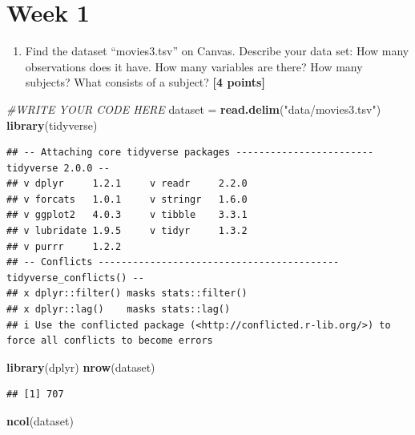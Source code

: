\documentclass[
]{article}
\newenvironment{Shaded}{\begin{snugshade}}{\end{snugshade}}
\newcommand{\CommentTok}[1]{\textcolor[rgb]{0.56,0.35,0.01}{\textit{#1}}}
\newcommand{\FunctionTok}[1]{\textcolor[rgb]{0.13,0.29,0.53}{\textbf{#1}}}
\newcommand{\NormalTok}[1]{#1}
\newcommand{\OtherTok}[1]{\textcolor[rgb]{0.56,0.35,0.01}{#1}}
\newcommand{\StringTok}[1]{\textcolor[rgb]{0.31,0.60,0.02}{#1}}
\providecommand{\tightlist}{%
  \setlength{\itemsep}{0pt}\setlength{\parskip}{0pt}}
\begin{document}
\section{Week 1}\label{week-1}

\begin{enumerate}
\def\labelenumi{\arabic{enumi}.}
\tightlist
\item
  Find the dataset ``movies3.tsv'' on Canvas. Describe your data set:
  How many observations does it have. How many variables are there? How
  many subjects? What consists of a subject? \textbf{[4 points]}
\end{enumerate}

\begin{Shaded}
\begin{Highlighting}[]
\CommentTok{\#WRITE YOUR CODE HERE}
\NormalTok{dataset }\OtherTok{=} \FunctionTok{read.delim}\NormalTok{(}\StringTok{"data/movies3.tsv"}\NormalTok{)}
\FunctionTok{library}\NormalTok{(tidyverse)}
\end{Highlighting}
\end{Shaded}

\begin{verbatim}
## -- Attaching core tidyverse packages ------------------------ tidyverse 2.0.0 --
## v dplyr     1.2.1     v readr     2.2.0
## v forcats   1.0.1     v stringr   1.6.0
## v ggplot2   4.0.3     v tibble    3.3.1
## v lubridate 1.9.5     v tidyr     1.3.2
## v purrr     1.2.2     
## -- Conflicts ------------------------------------------ tidyverse_conflicts() --
## x dplyr::filter() masks stats::filter()
## x dplyr::lag()    masks stats::lag()
## i Use the conflicted package (<http://conflicted.r-lib.org/>) to force all conflicts to become errors
\end{verbatim}

\begin{Shaded}
\begin{Highlighting}[]
\FunctionTok{library}\NormalTok{(dplyr)}
\FunctionTok{nrow}\NormalTok{(dataset)}
\end{Highlighting}
\end{Shaded}

\begin{verbatim}
## [1] 707
\end{verbatim}

\begin{Shaded}
\begin{Highlighting}[]
\FunctionTok{ncol}\NormalTok{(dataset)}
\end{Highlighting}
\end{Shaded}
\end{document}
